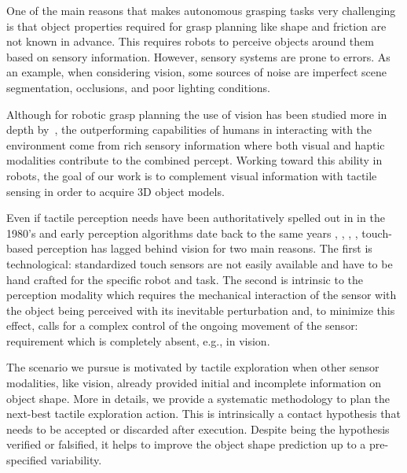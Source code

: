 
One of the main reasons that makes autonomous grasping tasks very challenging is that object properties required for grasp planning like shape and friction are not known %
in advance. 
This requires robots to perceive objects around them based on sensory information. However, sensory systems are prone to errors. As an example, when considering vision, some sources of noise are imperfect scene segmentation, occlusions, and poor lighting conditions.

Although for robotic grasp planning the use of vision has been studied more in depth by~\cite{Kragic2002TechRep}, the outperforming capabilities of humans in interacting with the environment come from rich sensory information where both visual and haptic modalities contribute to the combined percept. Working toward this ability in robots, the goal of our work is to complement visual information with tactile sensing in order to acquire 3D object models.

Even if tactile perception needs have been authoritatively spelled out in \cite{Bajcsy1988Active} in the 1980's and early perception algorithms date back to the same years \cite{Grimson1984JRR}, \cite{Faugeras1983IJCAI}, \cite{Shekhar1986ICRA}, \cite{Bajcsy1989Machine}, touch-based perception has lagged behind vision for two main reasons. The first is technological: standardized touch sensors are not easily available and have to be hand crafted for the specific robot and task. The second is intrinsic to the perception modality which requires the mechanical interaction of the sensor with the object being perceived with its inevitable perturbation and, to minimize this effect, calls for a complex control of the ongoing movement of the sensor: requirement which is completely absent, e.g., in vision.

The scenario we pursue is motivated by tactile exploration when other sensor modalities, like vision, already provided initial and incomplete information on object shape. More in details, we provide a systematic methodology to plan the next-best tactile exploration action. This is intrinsically a contact hypothesis that needs to be accepted or discarded after execution. Despite being the hypothesis verified or falsified, it helps to improve the object shape prediction up to a pre-specified variability.

